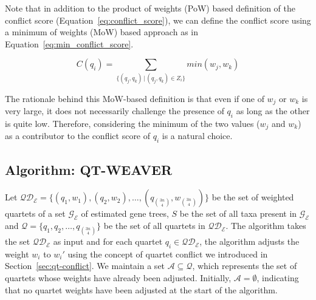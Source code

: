 \documentclass[10pt,a4paper]{article}
\begin{document}
Note that in addition to the product of weights (PoW) based definition of the conflict score (Equation~\ref{eq:conflict_score}), we can define the conflict score using a minimum of weights (MoW) based approach as in Equation~\ref{eq:min_conflict_score}. %

\begin{equation}
\label{eq:min_conflict_score}
C(q_i) = \sum_{\{(q_j, q_k) \,|\, (q_j, q_k) \in Z_i\}} min(w_j , w_k)
\end{equation}

The rationale behind this MoW-based definition is that even if one of $w_j$ or $w_k$ is very large, it does not necessarily challenge the presence of $q_i$ as long as the other is quite low. Therefore, considering the minimum of the two values ($w_j$ and $w_k$) as a contributor to the conflict score of $q_i$ is a natural choice.


\subsection{Algorithm: QT-WEAVER}
\label{sec:qt-weaver-algorithm}

Let $\mathcal{QD_E} = \{ (q_1,w_1), (q_2,w_2), \ldots, (q_{3n \choose 4},w_{3n \choose 4}) \}$ be the set of weighted quartets of a set $\mathcal{G_E}$ of estimated gene trees, $S$ be the set of all taxa present in  $\mathcal{G_E}$ and $\mathcal{Q} = \{ q_1, q_2, \ldots,q_{3n \choose 4} \} $ be the set of all quartets in $\mathcal{QD_E}$. The algorithm takes the set $\mathcal{QD_E}$ as input and for each quartet $q_i \in \mathcal{QD_E}$, the algorithm adjusts the weight $w_i$ to $w_i'$ using the concept of quartet conflict we introduced in Section~\ref{sec:qt-conflict}. We maintain a set \( \mathcal{A} \subseteq \mathcal{Q} \), which represents the set of quartets whose weights have already been adjusted.  Initially, \( \mathcal{A} = \emptyset \), indicating that no quartet weights have been adjusted at the start of the algorithm.
\end{document}
